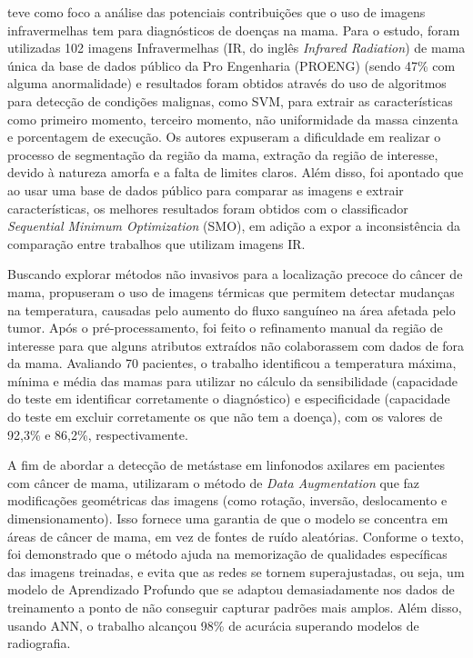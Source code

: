  teve como foco a análise das potenciais contribuições que o uso de imagens infravermelhas tem para diagnósticos de doenças na mama. Para o estudo, foram utilizadas 102 imagens Infravermelhas (IR, do inglês \textit{Infrared Radiation}) de mama única da base de dados público da Pro Engenharia (PROENG) (sendo 47\% com alguma anormalidade) e resultados foram obtidos através do uso de algoritmos para detecção de condições malignas, como SVM, para extrair as características como primeiro momento, terceiro momento, não uniformidade da massa cinzenta e porcentagem de execução. Os autores expuseram a dificuldade em realizar o processo de segmentação da região da mama, extração da região de interesse, devido à natureza amorfa e a falta de limites claros. Além disso, foi apontado que ao usar uma base de dados público para comparar as imagens e extrair características, os melhores resultados foram obtidos com o classificador \textit{Sequential Minimum Optimization} (SMO), em adição a expor a inconsistência da comparação entre trabalhos que utilizam imagens IR. 

Buscando explorar métodos não invasivos para a localização precoce do câncer de mama,  propuseram o uso de imagens térmicas que permitem detectar mudanças na temperatura, causadas pelo aumento do fluxo sanguíneo na área afetada pelo tumor. Após o pré-processamento, foi feito o refinamento manual da região de interesse para que alguns atributos extraídos não colaborassem com dados de fora da mama. Avaliando 70 pacientes, o trabalho identificou a temperatura máxima, mínima e média das mamas para utilizar no cálculo da sensibilidade (capacidade do teste em identificar corretamente o diagnóstico) e especificidade (capacidade do teste em excluir corretamente os que não tem a doença), com os valores de 92,3\% e 86,2\%, respectivamente.

A fim de abordar a detecção de metástase em linfonodos axilares em pacientes com câncer de mama,  utilizaram o método de \textit{Data Augmentation} que faz modificações geométricas das imagens (como rotação, inversão, deslocamento e dimensionamento). Isso fornece uma garantia de que o modelo se concentra em áreas de câncer de mama, em vez de fontes de ruído aleatórias. Conforme o texto, foi demonstrado que o método ajuda na memorização de qualidades específicas das imagens treinadas, e evita que as redes se tornem superajustadas, ou seja, um modelo de Aprendizado Profundo que se adaptou demasiadamente nos dados de treinamento a ponto de não conseguir capturar padrões mais amplos. Além disso, usando ANN, o trabalho alcançou 98\% de acurácia superando modelos de radiografia.


